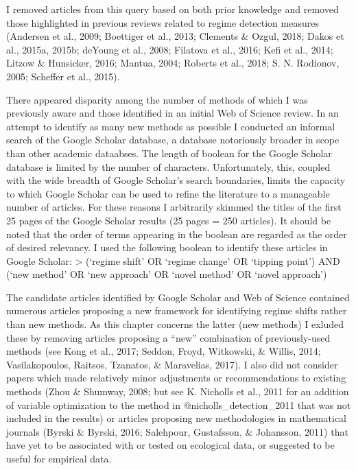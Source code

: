 \documentclass[12pt,twoside,openany]{reedthesis}
\begin{document}
I removed articles from this query based on both prior knowledge and removed those highlighted in previous reviews related to regime detection measures (Andersen et al., 2009; Boettiger et al., 2013; Clements \& Ozgul, 2018; Dakos et al., 2015a, 2015b; deYoung et al., 2008; Filatova et al., 2016; Kefi et al., 2014; Litzow \& Hunsicker, 2016; Mantua, 2004; Roberts et al., 2018; S. N. Rodionov, 2005; Scheffer et al., 2015).

There appeared disparity among the number of methods of which I was previously aware and those identified in an initial Web of Science review. In an attempt to identify as many new methods as possible I conducted an informal search of the Google Scholar database, a database notoriously broader in scope than other academic dataabses. The length of boolean for the Google Scholar database is limited by the number of characters. Unfortunately, this, coupled with the wide breadth of Google Scholar's search boundaries, limits the capacity to which Google Scholar can be used to refine the literature to a manageable number of articles. For these reasons I arbitrarily skimmed the titles of the first 25 pages of the Google Scholar results (25 pages = 250 articles). It should be noted that the order of terms appearing in the boolean are regarded as the order of desired relevancy. I used the following boolean to identify these articles in Google Scholar:
\textgreater{} (`regime shift' OR `regime change' OR `tipping point') AND (`new method' OR `new approach' OR `novel method' OR `novel approach')

The candidate articles identified by Google Scholar and Web of Science contained numerous articles proposing a new framework for identifying regime shifts rather than new methods. As this chapter concerns the latter (new methods) I exluded these by removing articles proposing a ``new'' combination of previously-used methods (see Kong et al., 2017; Seddon, Froyd, Witkowski, \& Willis, 2014; Vasilakopoulos, Raitsos, Tzanatos, \& Maravelias, 2017). I also did not consider papers which made relatively minor adjustments or recommendations to existing methods (Zhou \& Shumway, 2008; but see K. Nicholls et al., 2011 for an addition of variable optimization to the method in @nicholls\_detection\_2011 that was not included in the results) or articles proposing new methodologies in mathematical journals (Byrski \& Byrski, 2016; Salehpour, Gustafsson, \& Johansson, 2011) that have yet to be associated with or tested on ecological data, or suggested to be useful for empirical data.
\end{document}
